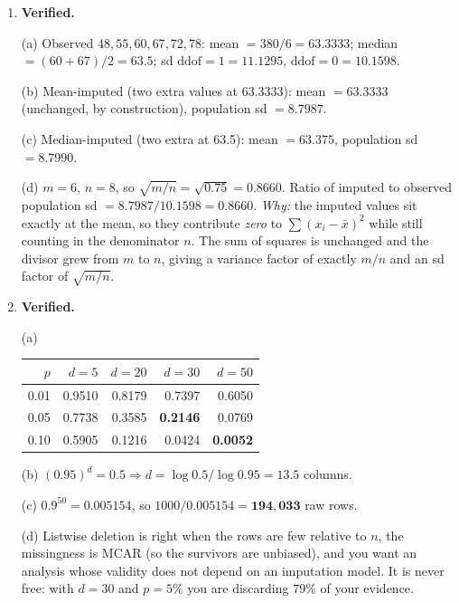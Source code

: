 \documentclass[11pt,a4paper]{article}
\newcommand{\A}[1]{\item[\textbf{#1}]}
\begin{document}
\begin{enumerate}[leftmargin=1.9cm]

\A{U4.54} \textbf{Verified.}
\begin{answerbox}
(a) Observed $48,55,60,67,72,78$: mean $= 380/6 = \mathbf{63.3333}$;
median $= (60+67)/2 = \mathbf{63.5}$; sd $\text{ddof}{=}1 = \mathbf{11.1295}$,
$\text{ddof}{=}0 = \mathbf{10.1598}$.

(b) Mean-imputed (two extra values at 63.3333): mean $= \mathbf{63.3333}$
(unchanged, by construction), population sd $= \mathbf{8.7987}$.

(c) Median-imputed (two extra at 63.5): mean $= \mathbf{63.375}$,
population sd $= \mathbf{8.7990}$.

(d) $m = 6$, $n = 8$, so $\sqrt{m/n} = \sqrt{0.75} = \mathbf{0.8660}$.
Ratio of imputed to observed population sd $= 8.7987/10.1598 = \mathbf{0.8660}$.
\emph{Why:} the imputed values sit exactly at the mean, so they contribute
\emph{zero} to $\sum(x_i - \bar x)^2$ while still counting in the denominator
$n$. The sum of squares is unchanged and the divisor grew from $m$ to $n$,
giving a variance factor of exactly $m/n$ and an sd factor of $\sqrt{m/n}$.
\end{answerbox}

\A{U4.55} \textbf{Verified.}
\begin{answerbox}
(a) \begin{center}\begin{tabular}{@{}rrrrr@{}}\toprule
$p$ & $d=5$ & $d=20$ & $d=30$ & $d=50$\\
\midrule
0.01 & 0.9510 & 0.8179 & 0.7397 & 0.6050\\
0.05 & 0.7738 & 0.3585 & \textbf{0.2146} & 0.0769\\
0.10 & 0.5905 & 0.1216 & 0.0424 & \textbf{0.0052}\\
\bottomrule\end{tabular}\end{center}

(b) $(0.95)^d = 0.5 \Rightarrow d = \log 0.5/\log 0.95 = \mathbf{13.5}$
columns.

(c) $0.9^{50} = 0.005154$, so $1000/0.005154 = \mathbf{194{,}033}$ raw rows.

(d) Listwise deletion is right when the rows are few relative to $n$, the
missingness is MCAR (so the survivors are unbiased), and you want an analysis
whose validity does not depend on an imputation model. It is never free: with
$d = 30$ and $p = 5\%$ you are discarding 79\% of your evidence.
\end{answerbox}


\end{enumerate}
\end{document}
